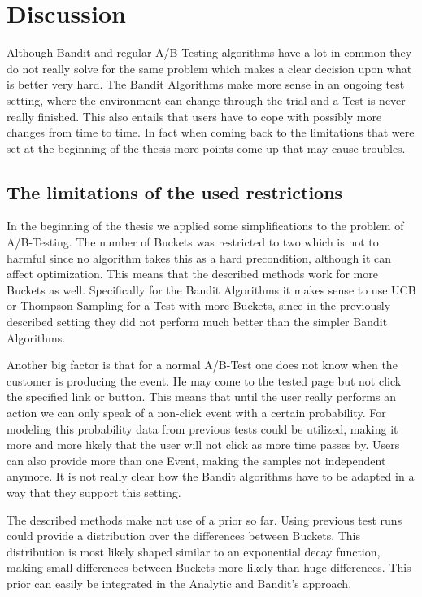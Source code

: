 \documentclass[main.tex]{subfiles}
\begin{document}
\chapter{Discussion}
Although Bandit and regular A/B Testing algorithms have a lot in common they do not really solve for the same problem which makes a clear decision upon what is better very hard. The Bandit Algorithms make more sense in an ongoing test setting, where the environment can change through the trial and a Test is never really finished. This also entails that users have to cope with possibly more changes from time to time. In fact when coming back to the limitations that were set at the beginning of the thesis more points come up that may cause troubles.

\section{The limitations of the used restrictions}
In the beginning of the thesis we applied some simplifications to the problem of A/B-Testing. The number of Buckets was restricted to two which is not to harmful since no algorithm takes this as a hard precondition, although it can affect optimization. This means that the described methods work for more Buckets as well. Specifically for the Bandit Algorithms it makes sense to use UCB or Thompson Sampling for a Test with more Buckets, since in the previously described setting they did not perform much better than the simpler Bandit Algorithms.

Another big factor is that for a normal A/B-Test one does not know when the customer is producing the event. He may come to the tested page but not click the specified link or button. This means that until the user really performs an action we can only speak of a non-click event with a certain probability. For modeling this probability data from previous tests could be utilized, making it more and more likely that the user will not click as more time passes by. Users can also provide more than one Event, making the samples not independent anymore. It is not really clear how the Bandit algorithms have to be adapted in a way that they support this setting.

The described methods make not use of a prior so far. Using previous test runs could provide a distribution over the differences between Buckets. This distribution is most likely shaped similar to an exponential decay function, making small differences between Buckets more likely than huge differences. This prior can easily be integrated in the Analytic and Bandit's approach.
\end{document}
